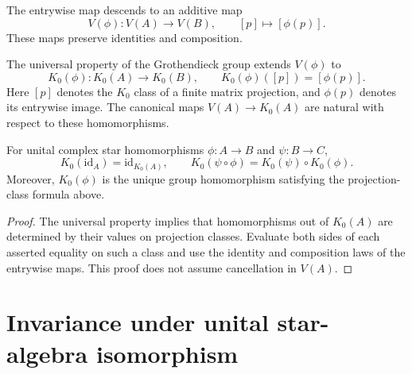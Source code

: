 \begin{definition}\label{def:stable-projection-map}
\leanok
The entrywise map descends to an additive map
\[
 V(\phi):V(A)\longrightarrow V(B),\qquad [p]\longmapsto[\phi(p)].
\]
These maps preserve identities and composition.
\end{definition}

\begin{definition}\label{def:unital-k0-map}
\leanok
The universal property of the Grothendieck group extends $V(\phi)$ to
\[
 K_0(\phi):K_0(A)\longrightarrow K_0(B),\qquad
 K_0(\phi)([p])=[\phi(p)].
\]
Here $[p]$ denotes the $K_0$ class of a finite matrix projection, and
$\phi(p)$ denotes its entrywise image. The canonical maps $V(A)\to K_0(A)$
are natural with respect to these homomorphisms.
\end{definition}

\begin{proposition}\label{prop:unital-k0-functoriality}
For unital complex star homomorphisms $\phi:A\to B$ and $\psi:B\to C$,
\[
 K_0(\mathrm{id}_A)=\mathrm{id}_{K_0(A)},\qquad
 K_0(\psi\circ\phi)=K_0(\psi)\circ K_0(\phi).
\]
Moreover, $K_0(\phi)$ is the unique group homomorphism satisfying the
projection-class formula above.
\end{proposition}
\begin{proof}
\leanok
The universal property implies that homomorphisms out of $K_0(A)$ are
determined by their values on projection classes. Evaluate both sides of
each asserted equality on such a class and use the identity and composition
laws of the entrywise maps. This proof does not assume cancellation in $V(A)$.
\end{proof}

\section{Invariance under unital star-algebra isomorphism}

